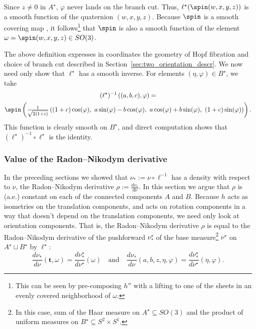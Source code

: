 Since $z \neq 0$ in $A^\star$, $\varphi$ never lands on the branch cut.
Thus, $\ell^\star(\spin(w,x,y,z))$ is a smooth function of the quaternion $(w,x,y,z)$.
Because $\spin$ is a smooth covering map \cite[ch.~4]{lee2003smooth}, it follows\footnote{
    This can be seen by pre-composing $h''$ with a lifting to one of the sheets in an evenly covered neighborhood of $\omega$.
} that $\spin$ is also a smooth function of the element $\omega = \spin(w,x,y,z) \in SO(3)$.

The above definition expresses in coordinates the geometry of Hopf fibration and choice of branch cut described in Section~\ref{sec:two_orientation_descr}.
We now need only show that $\ell^\star$ has a smooth inverse.
For elements $(\eta, \varphi) \in B^\star$, we take~\cite[\S7]{baldwin2017hopf}
\begin{multline*}
    (\ell^\star)^{-1}\left((a, b, c), \varphi\right) = \\
    \spin\left(
        \tfrac{1}{\sqrt{2(1 + c)}} \left(
            (1 + c)\cos(\varphi),\ 
            a\sin(\varphi) - b\cos(\varphi),\ 
            a\cos(\varphi) + b\sin(\varphi),\ 
            (1 + c)\sin(\varphi)
        \right)
    \right).
\end{multline*}
This function is clearly smooth on $B^\star$, and direct computation shows that $(\ell^\star)^{-1} \circ \ell^\star$ is the identity.


\subsubsection{Value of the Radon--Nikodym derivative}

In the preceding sections we showed that $\nu_* := \nu \circ \ell^{-1}$ has a density with respect to $\nu$, the Radon--Nikodym derivative $\rho := \frac{d\nu_*}{d\nu}$.
In this section we argue that $\rho$ is (a.e.) constant on each of the connected components $A$ and $B$.
Because $h$ acts as isometries on the translation components, and acts on rotation components in a way that doesn't depend on the translation components, we need only look at orientation components.
That is, the Radon--Nikodym derivative $\rho$ is equal to the Radon--Nikodym derivative of the pushforward $\nu^\star_*$ of the base measure\footnote{
    In this case, sum of the Haar measure on $A^\star \subseteq SO(3)$ and the product of uniform measures on $B^\star \subseteq S^2 \times S^1$.
} $\nu^\star$ on $A^\star \sqcup B^\star$ by $\ell^\star$:
\[ \textstyle
    \frac{d\nu_*}{d\nu}(\mathbf{t}, \omega) = \frac{d\nu^\star_*}{d\nu^\star}(\omega)
    \quad\text{and}\quad
    \frac{d\nu_*}{d\nu}(a,b,z,\eta,\varphi) = \frac{d\nu^\star_*}{d\nu^\star}(\eta,\varphi).
\]

